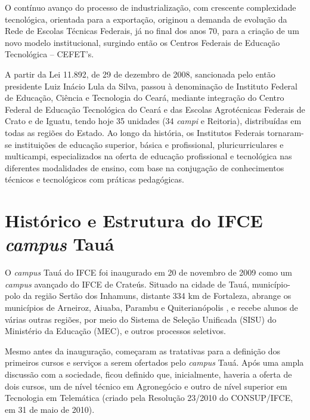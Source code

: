 \documentclass[
	12pt,				%
	openright,			%
	twoside,			%
	a4paper,			%
	chapter=TITLE,		%
	english,			%
	french,				%
	spanish,			%
	brazil,				%
	]{abntex2}
\begin{document}
O contínuo avanço do processo de industrialização, com crescente complexidade tecnológica, orientada para a exportação, originou a demanda de evolução da Rede de Escolas Técnicas Federais, já no final dos anos 70, para a criação de um novo modelo institucional, surgindo então os Centros Federais de Educação Tecnológica – CEFET's.


A partir da Lei 11.892, de 29 de dezembro de 2008, sancionada pelo então
presidente Luiz Inácio Lula da Silva, passou \`a denominação de Instituto
Federal de Educação, Ciência e Tecnologia do Ceará, mediante integração do
Centro Federal de Educação Tecnológica do Ceará e das Escolas Agrotécnicas
Federais de Crato e de Iguatu, tendo hoje 35 unidades (34 \textit{campi} e Reitoria), distribuídas em todas as
regiões do Estado.
Ao longo da história, os Institutos Federais tornaram-se instituições de
educação superior, básica e profissional, pluricurriculares e multicampi,
especializados na oferta de educação profissional e tecnológica nas diferentes
modalidades de ensino, com base na conjugação de conhecimentos técnicos e
tecnológicos com práticas pedagógicas.



\section{Histórico e Estrutura do IFCE \textit{campus} Tauá}

O \textit{campus} Tauá do IFCE foi inaugurado em 20 de novembro de 2009 como um \textit{campus} avançado do IFCE de Crateús. Situado na cidade de Tauá, município-polo da região Sertão dos Inhamuns, distante 334 $\mathrm{km}$ de Fortaleza, abrange os municípios de Arneiroz, Aiuaba, Parambu e Quiterianópolis \cite{ipece17}, e recebe alunos de várias outras regiões, por meio do Sistema de Seleção Unificada (SISU) do Ministério da Educação (MEC), e outros processos seletivos.

Mesmo antes da inauguração, começaram as tratativas para a definição dos primeiros cursos e serviços a serem ofertados pelo \textit{campus} Tauá. Após uma ampla discussão com a sociedade, ficou definido que, inicialmente, haveria a oferta de dois cursos, um de nível técnico em Agronegócio e outro de nível superior em Tecnologia em Telemática (criado pela Resolução 23/2010 do CONSUP/IFCE, em 31 de maio de 2010).
\end{document}
